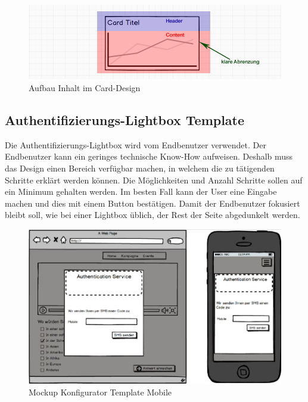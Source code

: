 \begin{figure}[htbp]
\centering
\includegraphics{images/mockups/card.jpg}
\caption{Aufbau Inhalt im Card-Design}
\end{figure}

\newpage

\hypertarget{authentifizierungs-lightbox-template}{\subsection{Authentifizierungs-Lightbox
Template}\label{authentifizierungs-lightbox-template}}

Die Authentifizierungs-Lightbox wird vom Endbenutzer verwendet. Der
Endbenutzer kann ein geringes technische Know-How aufweisen. Deshalb
muss das Design einen Bereich verfügbar machen, in welchem die zu
tätigenden Schritte erklärt werden können. Die Möglichkeiten und Anzahl
Schritte sollen auf ein Minimum gehalten werden. Im besten Fall kann der
User eine Eingabe machen und dies mit einem Button bestätigen. Damit der
Endbenutzer fokusiert bleibt soll, wie bei einer Lightbox üblich, der
Rest der Seite abgedunkelt werden.

\begin{figure}[htbp]
\centering
\includegraphics{images/mockups/authenticationlightbox.jpg}
\caption{Mockup Konfigurator Template Mobile}
\end{figure}

